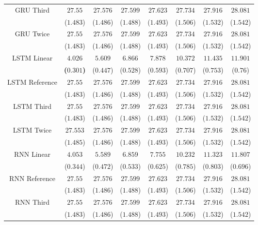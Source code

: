 \begin{table}[!ht]
{\begin{tabular}{|c|c|c|c|c|c|c|c|}
			\multirow{2}{*}{GRU Third} & $27.55$ & $27.576$ & $27.599$ & $27.623$ & $27.734$ & $27.916$ & $28.081$ \\
			 & ($1.483$) & ($1.486$) & ($1.488$) & ($1.493$) & ($1.506$) & ($1.532$) & ($1.542$) \\ \hline
			\multirow{2}{*}{GRU Twice} & $27.55$ & $27.576$ & $27.599$ & $27.623$ & $27.734$ & $27.916$ & $28.081$ \\
			 & ($1.483$) & ($1.486$) & ($1.488$) & ($1.493$) & ($1.506$) & ($1.532$) & ($1.542$) \\ \hline
			\multirow{2}{*}{LSTM Linear} & $\mathbf{4.026}$ & $5.609$ & $6.866$ & $7.878$ & $10.372$ & $11.435$ & $11.901$ \\
			 & \textbf{(}$\mathbf{0.301}$\textbf{)} & ($0.447$) & ($0.528$) & ($0.593$) & ($0.707$) & ($0.753$) & ($0.76$) \\ \hline
			\multirow{2}{*}{LSTM Reference} & $27.55$ & $27.576$ & $27.599$ & $27.623$ & $27.734$ & $27.916$ & $28.081$ \\
			 & ($1.483$) & ($1.486$) & ($1.488$) & ($1.493$) & ($1.506$) & ($1.532$) & ($1.542$) \\ \hline
			\multirow{2}{*}{LSTM Third} & $27.55$ & $27.576$ & $27.599$ & $27.623$ & $27.734$ & $27.916$ & $28.081$ \\
			 & ($1.483$) & ($1.486$) & ($1.488$) & ($1.493$) & ($1.506$) & ($1.532$) & ($1.542$) \\ \hline
			\multirow{2}{*}{LSTM Twice} & $27.553$ & $27.576$ & $27.599$ & $27.623$ & $27.734$ & $27.916$ & $28.081$ \\
			 & ($1.485$) & ($1.486$) & ($1.488$) & ($1.493$) & ($1.506$) & ($1.532$) & ($1.542$) \\ \hline
			\multirow{2}{*}{RNN Linear} & $4.053$ & $5.589$ & $6.859$ & $7.755$ & $10.232$ & $11.323$ & $11.807$ \\
			 & ($0.344$) & ($0.472$) & ($0.533$) & ($0.625$) & ($0.785$) & ($0.803$) & ($0.696$) \\ \hline
			\multirow{2}{*}{RNN Reference} & $27.55$ & $27.576$ & $27.599$ & $27.623$ & $27.734$ & $27.916$ & $28.081$ \\
			 & ($1.483$) & ($1.486$) & ($1.488$) & ($1.493$) & ($1.506$) & ($1.532$) & ($1.542$) \\ \hline
			\multirow{2}{*}{RNN Third} & $27.55$ & $27.576$ & $27.599$ & $27.623$ & $27.734$ & $27.916$ & $28.081$ \\
			 & ($1.483$) & ($1.486$) & ($1.488$) & ($1.493$) & ($1.506$) & ($1.532$) & ($1.542$) \\ \hline

\end{tabular}}
\end{table}

